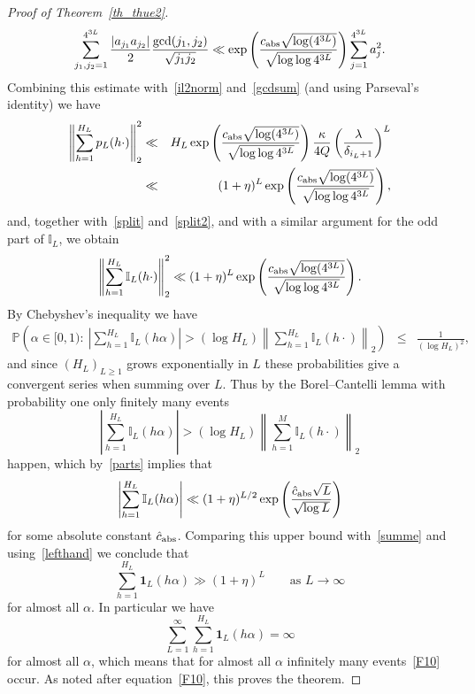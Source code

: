 \documentclass[12pt]{amsart}
\newcommand {\p} {\mathbb{P}}
\begin{document}
\begin{proof}[Proof of Theorem~\ref{th_thue2}]
$$
\sum_{j_1,j_2=1}^{4^{3L}} \frac{|a_{j_1} a_{j_2}|}{2} \frac{\gcd(j_1,j_2)}{\sqrt{j_1 j_2}} \ll \exp \left( \frac{c_{\textup{abs}} \sqrt{\log (4^{3L})}}{\sqrt{\log \log 4^{3L}}} \right) \sum_{j=1}^{4^{3L}} a_j^2.
$$
Combining this estimate with~\eqref{il2norm} and~\eqref{gcdsum} (and using Parseval's identity) we have
\begin{eqnarray*}
\left\| \sum_{h=1}^{H_L} p_L (h \cdot) \right\|_2^2 & \ll & H_L \exp \left( \frac{c_{\textup{abs}} \sqrt{\log (4^{3L})}}{\sqrt{\log \log 4^{3L}}} \right) \frac{\kappa}{4 Q} \left(\frac{\lambda}{\delta_{i_{L}+1}}\right)^{L} \\
& \ll & (1+\eta)^L \exp \left( \frac{c_{\textup{abs}} \sqrt{\log (4^{3L})}}{\sqrt{\log \log 4^{3L}}} \right),
\end{eqnarray*}
and, together with~\eqref{split} and~\eqref{split2}, and with a similar argument for the odd part of $\mathbb{I}_L$, we obtain
\begin{equation} \label{parts}
\left\| \sum_{h=1}^{H_L} \mathbb{I}_L (h \cdot) \right\|_2^2 \ll (1+\eta)^L \exp \left( \frac{c_{\textup{abs}} \sqrt{\log (4^{3L})}}{\sqrt{\log \log 4^{3L}}} \right).
\end{equation}
By Chebyshev's inequality we have
\begin{eqnarray*}
\p \left( \alpha \in [0,1):~ \left| \sum_{h=1}^{H_L} \mathbb{I}_L (h \alpha) \right| > (\log H_L) \left\| \sum_{h=1}^{H_L} \mathbb{I}_L (h \cdot) \right\|_2 \right) & \leq & \frac{1}{(\log H_L)^2},
\end{eqnarray*}
and since $(H_L)_{L \geq 1}$ grows exponentially in $L$ these probabilities give a convergent series when summing over $L$. Thus by the Borel--Cantelli lemma with probability one only finitely many events
$$
\left| \sum_{h=1}^{H_L} \mathbb{I}_L (h \alpha) \right| > (\log H_L) \left\| \sum_{h=1}^{M} \mathbb{I}_L (h \cdot) \right\|_2
$$
happen, which by~\eqref{parts} implies that 
$$
\left| \sum_{h=1}^{H_L} \mathbb{I}_L (h \alpha) \right| \ll (1 + \eta)^{L/2} \exp \left( \frac{\hat{c}_{\textup{abs}} \sqrt{L}}{\sqrt{\log L}} \right)
$$
for some absolute constant $\hat{c}_{\textup{abs}}$. Comparing this upper bound with~\eqref{summe} and using~\eqref{lefthand} we conclude that
$$
\sum_{h=1}^{H_L}  \mathbf{1}_L (h \alpha) \gg (1+\eta)^L \qquad \textrm{as $L \to \infty$}
$$
for almost all $\alpha$. In particular we have
$$
\sum_{L=1}^\infty \sum_{h=1}^{H_L}  \mathbf{1}_L (h \alpha) = \infty
$$
for almost all $\alpha$, which means that for almost all $\alpha$ infinitely many events~\eqref{F10} occur. As noted after equation~\eqref{F10}, this proves the theorem.
\end{proof}
\end{document}

